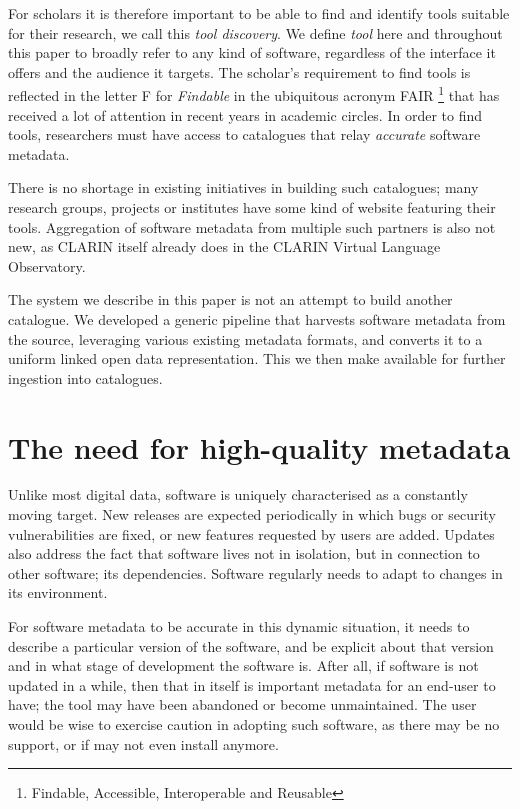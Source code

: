 \documentclass[a4paper,11pt]{article}
\begin{document}
For scholars it is therefore important to be able to find and identify
tools suitable for their research, we call this \emph{tool discovery}. We
define \emph{tool} here and throughout this paper to broadly refer to any kind
of software, regardless of the interface it offers and the audience it targets.
The scholar's requirement to find tools is reflected in the letter \textsc{F}
for \emph{Findable} in the ubiquitous acronym \textsc{FAIR} \footnote{Findable,
Accessible, Interoperable and Reusable} that has received a lot of attention in recent
years in academic circles. In order to find tools, researchers must have access to catalogues that
relay \emph{accurate} software metadata.

There is no shortage in existing initiatives in building such catalogues; many
research groups, projects or institutes have some kind of website featuring
their tools. Aggregation of software metadata from multiple such partners is
also not new, as CLARIN itself already does in the CLARIN Virtual Language
Observatory.

The system we describe in this paper is not an attempt to build another catalogue.
We developed a generic pipeline that harvests software metadata from the source, leveraging
various existing metadata formats, and converts it to a uniform linked open data representation.
This we then make available for further ingestion into catalogues. 

\section{The need for high-quality metadata}

Unlike most digital data, software is uniquely characterised as a constantly
moving target. New releases are expected periodically in which bugs or security
vulnerabilities are fixed, or new features requested by users are added.
Updates also address the fact that software lives not in isolation, but in
connection to other software; its dependencies. Software regularly needs to
adapt to changes in its environment.

For software metadata to be accurate in this dynamic situation, it needs to describe a
particular version of the software, and be explicit about that version and in
what stage of development the software is. After all, if software is not
updated in a while, then that in itself is important metadata for an end-user
to have; the tool may have been abandoned or become unmaintained. The user
would be wise to exercise caution in adopting such software, as there may be no
support, or if may not even install anymore.
\end{document}
